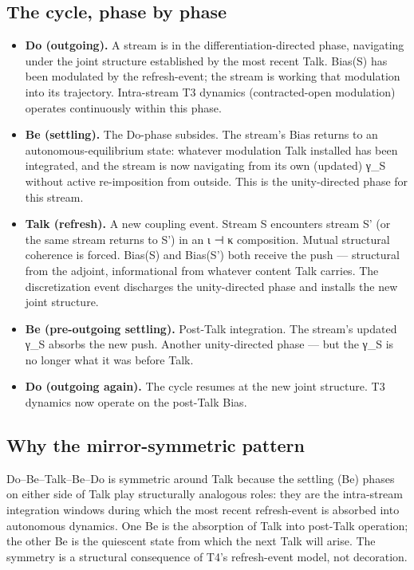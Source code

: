\documentclass[11pt, openany]{book}
\begin{document}
\subsection{The cycle, phase by phase}

\begin{itemize}
\item \textbf{Do (outgoing).} A stream is in the differentiation-directed phase, navigating under the joint structure established by the most recent Talk. Bias(S) has been modulated by the refresh-event; the stream is working that modulation into its trajectory. Intra-stream T3 dynamics (contracted-open modulation) operates continuously within this phase.
\item \textbf{Be (settling).} The Do-phase subsides. The stream's Bias returns to an autonomous-equilibrium state: whatever modulation Talk installed has been integrated, and the stream is now navigating from its own (updated) γ\_\allowbreak{}S without active re-imposition from outside. This is the unity-directed phase for this stream.
\item \textbf{Talk (refresh).} A new coupling event. Stream S encounters stream S' (or the same stream returns to S') in an ι ⊣ κ composition. Mutual structural coherence is forced. Bias(S) and Bias(S') both receive the push --- structural from the adjoint, informational from whatever content Talk carries. The discretization event discharges the unity-directed phase and installs the new joint structure.
\item \textbf{Be (pre-outgoing settling).} Post-Talk integration. The stream's updated γ\_\allowbreak{}S absorbs the new push. Another unity-directed phase --- but the γ\_\allowbreak{}S is no longer what it was before Talk.
\item \textbf{Do (outgoing again).} The cycle resumes at the new joint structure. T3 dynamics now operate on the post-Talk Bias.
\end{itemize}

\subsection{Why the mirror-symmetric pattern}

Do–Be–Talk–Be–Do is symmetric around Talk because the settling (Be) phases on either side of Talk play structurally analogous roles: they are the intra-stream integration windows during which the most recent refresh-event is absorbed into autonomous dynamics. One Be is the absorption of Talk into post-Talk operation; the other Be is the quiescent state from which the next Talk will arise. The symmetry is a structural consequence of T4's refresh-event model, not decoration.
\end{document}

